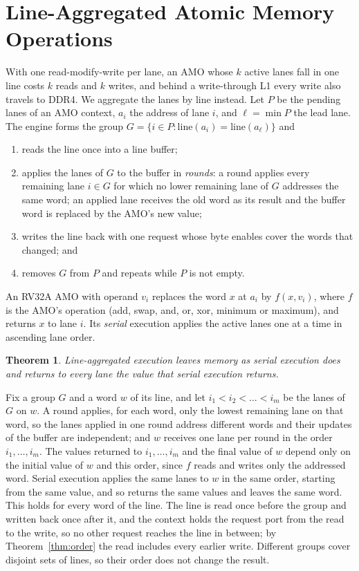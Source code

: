 \documentclass[journal]{IEEEtran}
\newtheorem{theorem}{Theorem}
\begin{document}
\section{Line-Aggregated Atomic Memory Operations}\label{sec:amo}
With one read-modify-write per lane, an AMO whose $k$ active lanes fall in one
line costs $k$ reads and $k$ writes, and behind a write-through L1 every write
also travels to DDR4. We aggregate the lanes by line instead. Let $P$ be the
pending lanes of an AMO context, $a_i$ the address of lane $i$, and $\ell=\min P$
the lead lane. The engine forms the group
$G=\{i\in P:\mathrm{line}(a_i)=\mathrm{line}(a_\ell)\}$ and
\begin{enumerate}
\item reads the line once into a line buffer;
\item applies the lanes of $G$ to the buffer in \emph{rounds}: a round applies
every remaining lane $i\in G$ for which no lower remaining lane of $G$ addresses
the same word; an applied lane receives the old word as its result and the buffer
word is replaced by the AMO's new value;
\item writes the line back with one request whose byte enables cover the words
that changed; and
\item removes $G$ from $P$ and repeats while $P$ is not empty.
\end{enumerate}
An RV32A AMO with operand $v_i$ replaces the word $x$ at $a_i$ by $f(x,v_i)$, where
$f$ is the AMO's operation (add, swap, and, or, xor, minimum or maximum), and returns
$x$ to lane $i$. Its \emph{serial} execution applies the active lanes one at a time
in ascending lane order.

\begin{theorem}\label{thm:amo}
Line-aggregated execution leaves memory as serial execution does and returns to every
lane the value that serial execution returns.
\end{theorem}
\begin{IEEEproof}
Fix a group $G$ and a word $w$ of its line, and let $i_1<i_2<\dots<i_m$ be the lanes
of $G$ on $w$. A round applies, for each word, only the lowest remaining lane on that
word, so the lanes applied in one round address different words and their updates
of the buffer are independent; and $w$ receives one lane per round in the order
$i_1,\dots,i_m$. The values returned to $i_1,\dots,i_m$ and the final value of $w$
depend only on the initial value of $w$ and this order, since $f$ reads and writes
only the addressed word. Serial execution applies the same lanes to $w$ in the same
order, starting from the same value, and so returns the same values and leaves the
same word. This holds for every word of the line. The line is read once before the
group and written back once after it, and the context holds the request port from
the read to the write, so no other request reaches the line in between; by
Theorem~\ref{thm:order} the read includes every earlier write. Different groups
cover disjoint sets of lines, so their order does not change the result.
\end{IEEEproof}
\end{document}
